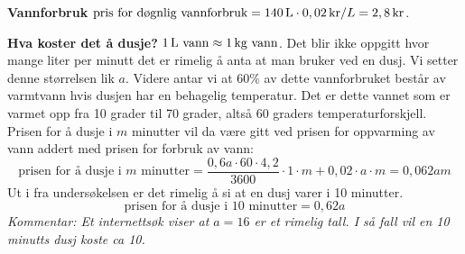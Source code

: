 \textbf{Vannforbruk} \os
$ \text{pris for døgnlig vannforbruk}=140\,\textrm{L}\cdot 0,02\,\textrm{kr}/L=2,8\,\textrm{kr} $.\vsk

\textbf{Hva koster det å dusje?} \os
$ 1\,\textrm{L}\text{ vann}\approx1\,\textrm{kg}\text{ vann} $. Det blir ikke oppgitt hvor mange liter per minutt det er rimelig å anta at man bruker ved en dusj. Vi setter denne størrelsen lik $ a $. Videre antar vi at 60\% av dette vannforbruket består av varmtvann hvis dusjen har en behagelig temperatur. Det er dette vannet som er varmet opp fra 10 grader til 70 grader, altså 60 graders temperaturforskjell. Prisen for å dusje i $ m $ minutter vil da være gitt ved prisen for oppvarming av vann addert med prisen for forbruk av vann:
\[ \text{prisen for å dusje i } m \text{ minutter}= \frac{0,6a\cdot60\cdot4,2}{3600}\cdot1\cdot m+0,02\cdot a\cdot m=0,062am\]
Ut i fra undersøkelsen er det rimelig å si at en dusj varer i 10 minutter.
\[ \text{prisen for å dusje i } 10 \text{ minutter}= 0,62a\]
\textit{Kommentar: Et internettsøk viser at $ a=16 $ er et rimelig tall. I så fall vil en 10 minutts dusj koste ca 10. }

 